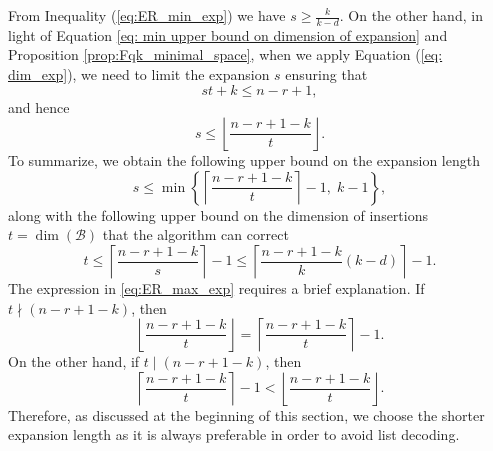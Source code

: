 \documentclass{article}
\newcommand{\calB}{\mathcal{B}}
\begin{document}
From Inequality (\ref{eq:ER_min_exp}) we have $s \geq \frac{k}{k-d}$.
On the other hand, in light of Equation \eqref{eq: min upper bound on dimension of expansion} and Proposition \ref{prop:Fqk_minimal_space}, when we apply Equation (\ref{eq: dim_exp}), we need to limit the expansion $s$ ensuring that 
\begin{equation}
    \label{eq: condition such that there is no arising of an Fqk linear space in the expansion}
    st + k \leq n-r +1,
\end{equation}
and hence 
\begin{equation}
    \label{eq: max s ER with floor}
    s\leq \left\lfloor\frac{n-r+1-k}{t}\right\rfloor.
\end{equation}
To summarize, we obtain the following upper bound on the expansion length
\begin{equation}
    \label{eq:ER_max_exp}
    s \leq \min\left\{\left\lceil\frac{n-r+1-k}{t}\right\rceil-1,\;k-1\right\},
\end{equation}
along with the following upper bound on the dimension of insertions $t=\dim(\calB)$ that the algorithm can correct
\begin{equation}
    \label{eq:ER_max_t}
    t \leq \left\lceil\frac{n-r+1-k}{s}\right\rceil-1
    \leq
    \left\lceil\frac{n-r+1-k}{k}(k-d)\right\rceil-1.
\end{equation}
The expression in \eqref{eq:ER_max_exp} requires a brief explanation. If $t\nmid (n-r+1-k)$, then
\[
\left\lfloor\frac{n-r+1-k}{t}\right\rfloor
=
\left\lceil\frac{n-r+1-k}{t}\right\rceil-1.
\]
On the other hand, if $t\mid (n-r+1-k)$, then
\[
\left\lceil\frac{n-r+1-k}{t}\right\rceil-1
<
\left\lfloor\frac{n-r+1-k}{t}\right\rfloor.
\]
Therefore, as discussed at the beginning of this section, we choose the shorter expansion length as it is always preferable in order to avoid list decoding.
\end{document}
